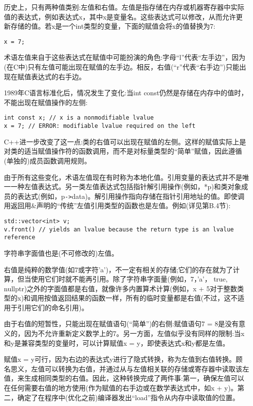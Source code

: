 
历史上，只有两种值类别:左值和右值。左值是指存储在内存或机器寄存器中实际值的表达式，例如表达式x，其中x是变量名。这些表达式可以修改，从而允许更新存储的值。若x是一个int类型的变量，下面的赋值会将x的值替换为7:

\begin{lstlisting}[style=styleCXX]
x = 7;
\end{lstlisting}

术语左值来自于这些表达式在赋值中可能扮演的角色:字母“l”代表“左手边”，因为(在C中)只有左值可能出现在赋值的左手边。相反，右值(“r”代表“右手边”)只能出现在赋值表达式的右手边。

1989年C语言标准化后，情况发生了变化:当int const仍然是存储在内存中的值时，不能出现在赋值操作的左侧:

\begin{lstlisting}[style=styleCXX]
int const x; // x is a nonmodifiable lvalue
x = 7; // ERROR: modifiable lvalue required on the left
\end{lstlisting}

C++进一步改变了这一点:类的右值可以出现在赋值的左侧。这样的赋值实际上是对类的适当赋值操作符的函数调用，而不是对标量类型的“简单”赋值，因此遵循(单独的)成员函数调用规则。

由于所有这些变化，术语左值现在有时称为本地化值。引用变量的表达式并不是唯一一种左值表达式。另一类左值表达式包括指针解引用操作(例如，*p)和类对象成员的表达式(例如，p\texttt{->}data)。解引用操作指向存储在指针引用地址的值。即使调用返回用\&声明的“传统”左值引用类型的函数也是左值。例如(详见第B.4节):

\begin{lstlisting}[style=styleCXX]
std::vector<int> v;
v.front() // yields an lvalue because the return type is an lvalue reference
\end{lstlisting}

字符串字面值也是(不可修改的)左值。

右值是纯粹的数学值(如7或字符'a')，不一定有相关的存储;它们的存在就为了计算，但当使用它们时就不能再引用。除了字符串字面量(例如，7，'a'， true, nullptr)之外的字面值都是右值，就像许多内置算术计算(例如，x + 5对于整数类型的x)和调用按值返回结果的函数一样，所有的临时变量都是右值(不过，这不适用于引用它们的命名引用)。


由于右值的短暂性，只能出现在赋值语句(“简单”)的右侧:赋值语句7 = 8是没有意义的，因为不允许重新定义数学上的7。另一方面，左值似乎没有同样的限制:当x和y是兼容类型的变量时，可以计算赋值x = y，即使表达式x和y都是左值。

赋值x = y可行，因为右边的表达式y进行了隐式转换，称为左值到右值转换。顾名思义，左值可以转换为右值，并通过从与左值相关联的存储或寄存器中读取该左值，来生成相同类型的右值。因此，这种转换完成了两件事:第一，确保左值可以在任何需要右值的地方使用(作为赋值的右手边或在数学表达式中，如x + y)。第二，确定了在程序中(优化之前)编译器发出“load”指令从内存中读取值的位置。


















